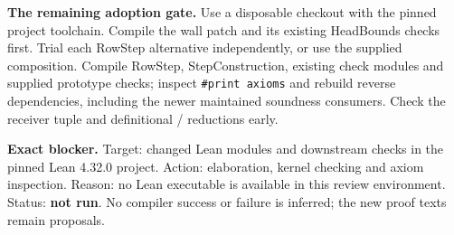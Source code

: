 \textbf{The remaining adoption gate.} Use a disposable checkout with the pinned project toolchain. Compile the wall patch and its existing HeadBounds checks first. Trial each RowStep alternative independently, or use the supplied composition. Compile RowStep, StepConstruction, existing check modules and supplied prototype checks; inspect \texttt{\#print axioms} and rebuild reverse dependencies, including the newer maintained soundness consumers. Check the receiver tuple  and definitional / reductions early.

\textbf{Exact blocker.} Target: changed Lean modules and downstream checks in the pinned Lean 4.32.0 project. Action: elaboration, kernel checking and axiom inspection. Reason: no Lean executable is available in this review environment. Status: \textbf{not run}. No compiler success or failure is inferred; the new proof texts remain proposals.
